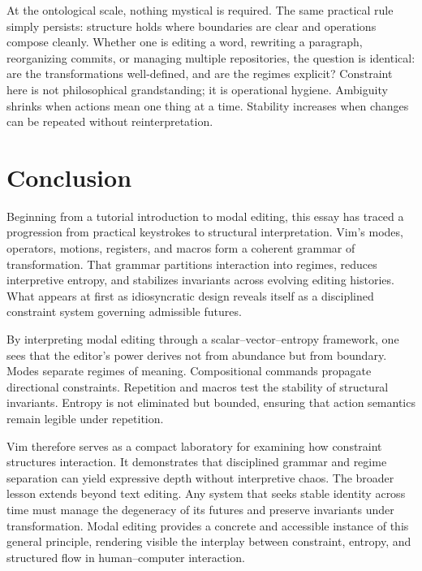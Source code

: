 \documentclass[12pt]{article}
\begin{document}
At the ontological scale, nothing mystical is required. The same practical rule simply persists: structure holds where boundaries are clear and operations compose cleanly. Whether one is editing a word, rewriting a paragraph, reorganizing commits, or managing multiple repositories, the question is identical: are the transformations well-defined, and are the regimes explicit? Constraint here is not philosophical grandstanding; it is operational hygiene. Ambiguity shrinks when actions mean one thing at a time. Stability increases when changes can be repeated without reinterpretation.

\section{Conclusion}

Beginning from a tutorial introduction to modal editing, this essay has traced a progression from practical keystrokes to structural interpretation. Vim’s modes, operators, motions, registers, and macros form a coherent grammar of transformation. That grammar partitions interaction into regimes, reduces interpretive entropy, and stabilizes invariants across evolving editing histories. What appears at first as idiosyncratic design reveals itself as a disciplined constraint system governing admissible futures.

By interpreting modal editing through a scalar–vector–entropy framework, one sees that the editor’s power derives not from abundance but from boundary. Modes separate regimes of meaning. Compositional commands propagate directional constraints. Repetition and macros test the stability of structural invariants. Entropy is not eliminated but bounded, ensuring that action semantics remain legible under repetition.

Vim therefore serves as a compact laboratory for examining how constraint structures interaction. It demonstrates that disciplined grammar and regime separation can yield expressive depth without interpretive chaos. The broader lesson extends beyond text editing. Any system that seeks stable identity across time must manage the degeneracy of its futures and preserve invariants under transformation. Modal editing provides a concrete and accessible instance of this general principle, rendering visible the interplay between constraint, entropy, and structured flow in human–computer interaction.
\end{document}
